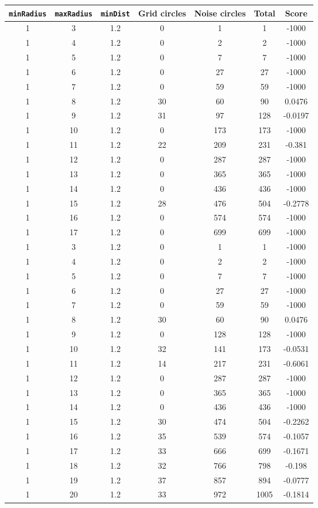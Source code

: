 \documentclass[letterpaper, 12pt]{article}
\begin{document}
\begin{longtable}{|c|c|c|c|c|c|c|}
\hline
\textbf{\texttt{minRadius}} & \textbf{\texttt{maxRadius}} & \textbf{\texttt{minDist}} & \textbf{Grid circles} & \textbf{Noise circles} & \textbf{Total} & \textbf{Score} \\
\hline
1 & 3 & 1.2 & 0 & 1 & 1 & -1000 \\
\hline
1 & 4 & 1.2 & 0 & 2 & 2 & -1000 \\
\hline
1 & 5 & 1.2 & 0 & 7 & 7 & -1000 \\
\hline
1 & 6 & 1.2 & 0 & 27 & 27 & -1000 \\
\hline
1 & 7 & 1.2 & 0 & 59 & 59 & -1000 \\
\hline
1 & 8 & 1.2 & 30 & 60 & 90 & 0.0476 \\
\hline
1 & 9 & 1.2 & 31 & 97 & 128 & -0.0197 \\
\hline
1 & 10 & 1.2 & 0 & 173 & 173 & -1000 \\
\hline
1 & 11 & 1.2 & 22 & 209 & 231 & -0.381 \\
\hline
1 & 12 & 1.2 & 0 & 287 & 287 & -1000 \\
\hline
1 & 13 & 1.2 & 0 & 365 & 365 & -1000 \\
\hline
1 & 14 & 1.2 & 0 & 436 & 436 & -1000 \\
\hline
1 & 15 & 1.2 & 28 & 476 & 504 & -0.2778 \\
\hline
1 & 16 & 1.2 & 0 & 574 & 574 & -1000 \\
\hline
1 & 17 & 1.2 & 0 & 699 & 699 & -1000 \\
\hline
1 & 3 & 1.2 & 0 & 1 & 1 & -1000 \\
\hline
1 & 4 & 1.2 & 0 & 2 & 2 & -1000 \\
\hline
1 & 5 & 1.2 & 0 & 7 & 7 & -1000 \\
\hline
1 & 6 & 1.2 & 0 & 27 & 27 & -1000 \\
\hline
1 & 7 & 1.2 & 0 & 59 & 59 & -1000 \\
\hline
1 & 8 & 1.2 & 30 & 60 & 90 & 0.0476 \\
\hline
1 & 9 & 1.2 & 0 & 128 & 128 & -1000 \\
\hline
1 & 10 & 1.2 & 32 & 141 & 173 & -0.0531 \\
\hline
1 & 11 & 1.2 & 14 & 217 & 231 & -0.6061 \\
\hline
1 & 12 & 1.2 & 0 & 287 & 287 & -1000 \\
\hline
1 & 13 & 1.2 & 0 & 365 & 365 & -1000 \\
\hline
1 & 14 & 1.2 & 0 & 436 & 436 & -1000 \\
\hline
1 & 15 & 1.2 & 30 & 474 & 504 & -0.2262 \\
\hline
1 & 16 & 1.2 & 35 & 539 & 574 & -0.1057 \\
\hline
1 & 17 & 1.2 & 33 & 666 & 699 & -0.1671 \\
\hline
1 & 18 & 1.2 & 32 & 766 & 798 & -0.198 \\
\hline
1 & 19 & 1.2 & 37 & 857 & 894 & -0.0777 \\
\hline
1 & 20 & 1.2 & 33 & 972 & 1005 & -0.1814 \\
\hline
\end{longtable}
\end{document}
